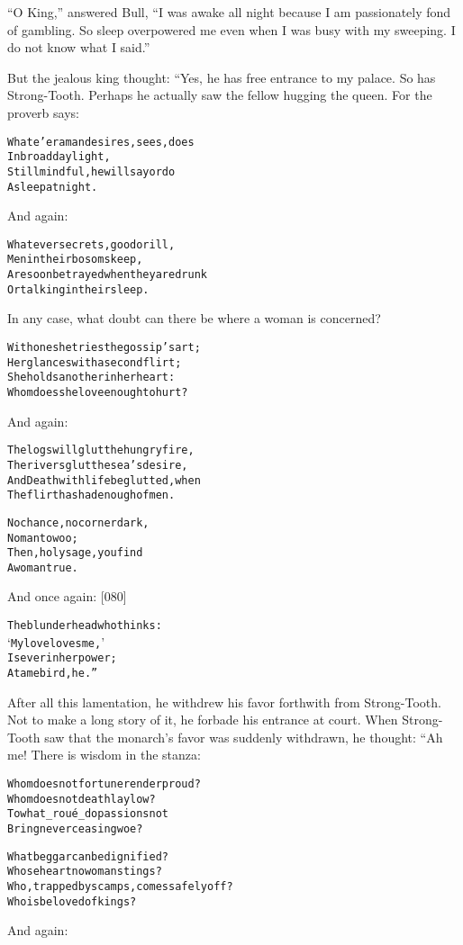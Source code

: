\documentclass{article}
\renewenvironment{verbatim}{\begin{alltt}\normalfont\begin{centering}}{\end{centering}\end{alltt}}
\begin{document}
``O King,'' answered Bull,
``I was awake all night because I am passionately fond of gambling. So sleep overpowered me even when I was busy with my sweeping. I do not know what I said.''

But the jealous king thought: “Yes, he has free entrance to my
palace. So has Strong-Tooth. Perhaps he actually saw the fellow
hugging the queen. For the proverb says:

\begin{verbatim}
Whate'er a man desires, sees, does
    In broad daylight,
Still mindful, he will say or do
    Asleep at night.
\end{verbatim}
And again:

\begin{verbatim}
Whatever secrets, good or ill,
Men in their bosoms keep,
Are soon betrayed when they are drunk
Or talking in their sleep.
\end{verbatim}
In any case, what doubt can there be where a woman is concerned?

\begin{verbatim}
With one she tries the gossip's art;
    Her glances with a second flirt;
She holds another in her heart:
    Whom does she love enough to hurt?
\end{verbatim}
And again:

\begin{verbatim}
The logs will glut the hungry fire,
The rivers glut the sea's desire,
And Death with life be glutted, when
The flirt has had enough of men.

No chance, no corner dark,
    No man to woo;
Then, holy sage, you find
    A woman true.
\end{verbatim}
And once again: [080]

\begin{verbatim}
The blunderhead who thinks:
    ‘My love loves me,’
Is ever in her power;
    A tame bird, he.”
\end{verbatim}
After all this lamentation, he withdrew his favor forthwith from
Strong-Tooth. Not to make a long story of it, he forbade his
entrance at court. When Strong-Tooth saw that the monarch's favor
was suddenly withdrawn, he thought: “Ah me! There is wisdom in the
stanza:

\begin{verbatim}
Whom does not fortune render proud?
    Whom does not death lay low?
To what _roué_ do passions not
    Bring never ceasing woe?

What beggar can be dignified?
    Whose heart no woman stings?
Who, trapped by scamps, comes safely off?
    Who is beloved of kings?
\end{verbatim}
And again:
\end{document}

